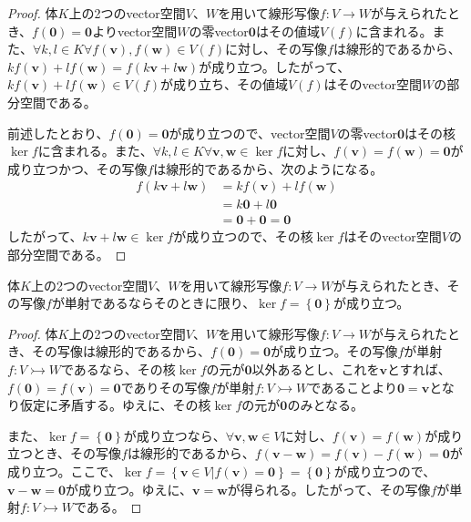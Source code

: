 \documentclass[dvipdfmx]{jsarticle}
\begin{document}
\begin{proof}
体$K$上の2つのvector空間$V$、$W$を用いて線形写像$f:V \rightarrow W$が与えられたとき、$f\left( \mathbf{0} \right) = \mathbf{0}$よりvector空間$W$の零vector$\mathbf{0}$はその値域$V(f)$に含まれる。また、$\forall k,l \in K\forall f\left( \mathbf{v} \right),f\left( \mathbf{w} \right) \in V(f)$に対し、その写像$f$は線形的であるから、$kf\left( \mathbf{v} \right) + lf\left( \mathbf{w} \right) = f\left( k\mathbf{v} + l\mathbf{w} \right)$が成り立つ。したがって、$kf\left( \mathbf{v} \right) + lf\left( \mathbf{w} \right) \in V(f)$が成り立ち、その値域$V(f)$はそのvector空間$W$の部分空間である。\par
前述したとおり、$f\left( \mathbf{0} \right) = \mathbf{0}$が成り立つので、vector空間$V$の零vector$\mathbf{0}$はその核$\ker f$に含まれる。また、$\forall k,l \in K\forall\mathbf{v},\mathbf{w} \in \ker f$に対し、$f\left( \mathbf{v} \right) = f\left( \mathbf{w} \right) = \mathbf{0}$が成り立つかつ、その写像$f$は線形的であるから、次のようになる。
\begin{align*}
f\left( k\mathbf{v} + l\mathbf{w} \right) &= kf\left( \mathbf{v} \right) + lf\left( \mathbf{w} \right)\\
&= k\mathbf{0} + l\mathbf{0}\\
&= \mathbf{0} + \mathbf{0} = \mathbf{0}
\end{align*}
したがって、$k\mathbf{v} + l\mathbf{w} \in \ker f$が成り立つので、その核$\ker f$はそのvector空間$V$の部分空間である。
\end{proof}
\begin{thm}\label{2.1.2.12}
体$K$上の2つのvector空間$V$、$W$を用いて線形写像$f:V \rightarrow W$が与えられたとき、その写像$f$が単射であるならそのときに限り、$\ker f = \left\{ \mathbf{0} \right\}$が成り立つ。
\end{thm}
\begin{proof}
体$K$上の2つのvector空間$V$、$W$を用いて線形写像$f:V \rightarrow W$が与えられたとき、その写像は線形的であるから、$f\left( \mathbf{0} \right) = \mathbf{0}$が成り立つ。その写像$f$が単射$f:V \rightarrowtail W$であるなら、その核$\ker f$の元が$\mathbf{0}$以外あるとし、これを$\mathbf{v}$とすれば、$f\left( \mathbf{0} \right) = f\left( \mathbf{v} \right) = \mathbf{0}$でありその写像$f$が単射$f:V \rightarrowtail W$であることより$\mathbf{0} = \mathbf{v}$となり仮定に矛盾する。ゆえに、その核$\ker f$の元が$\mathbf{0}$のみとなる。\par
また、$\ker f = \left\{ \mathbf{0} \right\}$が成り立つなら、$\forall\mathbf{v},\mathbf{w} \in V$に対し、$f\left( \mathbf{v} \right) = f\left( \mathbf{w} \right)$が成り立つとき、その写像$f$は線形的であるから、$f\left( \mathbf{v} - \mathbf{w} \right) = f\left( \mathbf{v} \right) - f\left( \mathbf{w} \right) = \mathbf{0}$が成り立つ。ここで、$\ker f = \left\{ \mathbf{v} \in V|f\left( \mathbf{v} \right) = \mathbf{0} \right\} = \left\{ \mathbf{0} \right\}$が成り立つので、$\mathbf{v} - \mathbf{w} = \mathbf{0}$が成り立つ。ゆえに、$\mathbf{v} = \mathbf{w}$が得られる。したがって、その写像$f$が単射$f:V \rightarrowtail W$である。
\end{proof}
\end{document}

